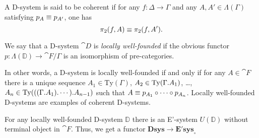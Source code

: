 \begin{defn}
A D-system is said to be coherent if for any $f:\Delta\to\Gamma$ and any
$A,A'\in\Lambda(\Gamma)$ satisfying $p_A\equiv p_{A'}$, one has
\begin{equation*}
\pi_2(f,A)\equiv \pi_2(f,A').
\end{equation*}
\end{defn}

\begin{defn}
We say that a D-system $\cat{D}$ is \emph{locally well-founded} if the obvious functor
$p:\Lambda(\mathbb{D})\to\cat{F}/\Gamma$ is an isomorphism of pre-categories.
\end{defn}

\begin{rmk}
In other words, a D-system is locally well-founded if and only if
for any $A\in\cat{F}$ there is a unique sequence
$A_1\in\mathrm{Ty}(\Gamma)$, $A_2\in\mathrm{Ty}(\ctxext{\Gamma}{A_1})$, \ldots,
$A_n\in\mathrm{Ty}(\ctxext{{{\Gamma}{A_1}}{\cdots}}{A_{n-1}})$ such that
$A\equiv p_{A_1}\circ\cdots\circ p_{A_n}$. Locally well-founded D-systems 
are examples of coherent D-systems.
\end{rmk}

\begin{defn}
For any locally well-founded D-system $\mathbb{D}$ there is 
an E'-system $U(\mathbb{D})$ without terminal object in 
$\cat{F}$. Thus, we get a functor $\mathbf{Dsys}\to\mathbf{E'sys}_{\circ}$
\end{defn}

